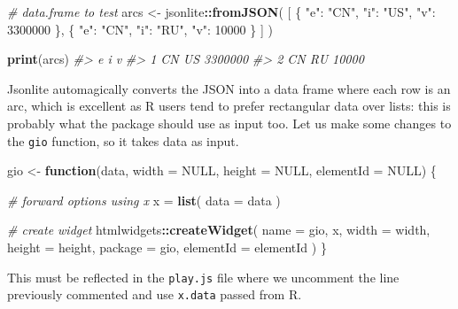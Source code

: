 \documentclass[
]{krantz}
\makeatletter
\newenvironment{Shaded}{\begin{snugshade}}{\end{snugshade}}
\newcommand{\CommentTok}[1]{\textcolor[rgb]{0.37,0.37,0.37}{\textit{#1}}}
\newcommand{\ControlFlowTok}[1]{\textcolor[rgb]{0.27,0.27,0.27}{\textbf{#1}}}
\newcommand{\DataTypeTok}[1]{\textcolor[rgb]{0.27,0.27,0.27}{#1}}
\newcommand{\KeywordTok}[1]{\textcolor[rgb]{0.27,0.27,0.27}{\textbf{#1}}}
\newcommand{\NormalTok}[1]{#1}
\newcommand{\OperatorTok}[1]{\textcolor[rgb]{0.43,0.43,0.43}{\textbf{#1}}}
\newcommand{\OtherTok}[1]{\textcolor[rgb]{0.37,0.37,0.37}{#1}}
\newcommand{\StringTok}[1]{\textcolor[rgb]{0.5,0.5,0.5}{#1}}
\newenvironment{kframe}{%
\medskip{}
\setlength{\fboxsep}{.8em}
 \def\at@end@of@kframe{}%
 \ifinner\ifhmode%
  \def\at@end@of@kframe{\end{minipage}}%
  \begin{minipage}{\columnwidth}%
 \fi\fi%
 \def\FrameCommand##1{\hskip\@totalleftmargin \hskip-\fboxsep
 \colorbox{shadecolor}{##1}\hskip-\fboxsep
     \hskip-\linewidth \hskip-\@totalleftmargin \hskip\columnwidth}%
 \MakeFramed {\advance\hsize-\width
   \@totalleftmargin\z@ \linewidth\hsize
   \@setminipage}}%
 {\par\unskip\endMakeFramed%
 \at@end@of@kframe}
\renewenvironment{Shaded}{\begin{kframe}}{\end{kframe}}
\makeatother
\begin{document}
\begin{Shaded}
\begin{Highlighting}[]
\CommentTok{\# data.frame to test}
\NormalTok{arcs <{-}}\StringTok{ }\NormalTok{jsonlite}\OperatorTok{::}\KeywordTok{fromJSON}\NormalTok{(}
  \StringTok{\textquotesingle{}[}
\StringTok{    \{}
\StringTok{      "e": "CN",}
\StringTok{      "i": "US",}
\StringTok{      "v": 3300000}
\StringTok{    \},}
\StringTok{    \{}
\StringTok{      "e": "CN",}
\StringTok{      "i": "RU",}
\StringTok{      "v": 10000}
\StringTok{    \}}
\StringTok{  ]\textquotesingle{}}
\NormalTok{)}

\KeywordTok{print}\NormalTok{(arcs)}
\CommentTok{\#>    e  i       v}
\CommentTok{\#> 1 CN US 3300000}
\CommentTok{\#> 2 CN RU   10000}
\end{Highlighting}
\end{Shaded}

Jsonlite automagically converts the JSON into a data frame where each row is an arc, which is excellent as R users tend to prefer rectangular data over lists: this is probably what the package should use as input too. Let us make some changes to the \texttt{gio} function, so it takes data as input.

\begin{Shaded}
\begin{Highlighting}[]
\NormalTok{gio <{-}}\StringTok{ }\ControlFlowTok{function}\NormalTok{(data, }\DataTypeTok{width =} \OtherTok{NULL}\NormalTok{, }\DataTypeTok{height =} \OtherTok{NULL}\NormalTok{, }\DataTypeTok{elementId =} \OtherTok{NULL}\NormalTok{) \{}

  \CommentTok{\# forward options using x}
\NormalTok{  x =}\StringTok{ }\KeywordTok{list}\NormalTok{(}
    \DataTypeTok{data =}\NormalTok{ data}
\NormalTok{  )}

  \CommentTok{\# create widget}
\NormalTok{  htmlwidgets}\OperatorTok{::}\KeywordTok{createWidget}\NormalTok{(}
    \DataTypeTok{name =} \StringTok{\textquotesingle{}gio\textquotesingle{}}\NormalTok{,}
\NormalTok{    x,}
    \DataTypeTok{width =}\NormalTok{ width,}
    \DataTypeTok{height =}\NormalTok{ height,}
    \DataTypeTok{package =} \StringTok{\textquotesingle{}gio\textquotesingle{}}\NormalTok{,}
    \DataTypeTok{elementId =}\NormalTok{ elementId}
\NormalTok{  )}
\NormalTok{\}}
\end{Highlighting}
\end{Shaded}

This must be reflected in the \texttt{play.js} file where we uncomment the line previously commented and use \texttt{x.data} passed from R.
\end{document}
